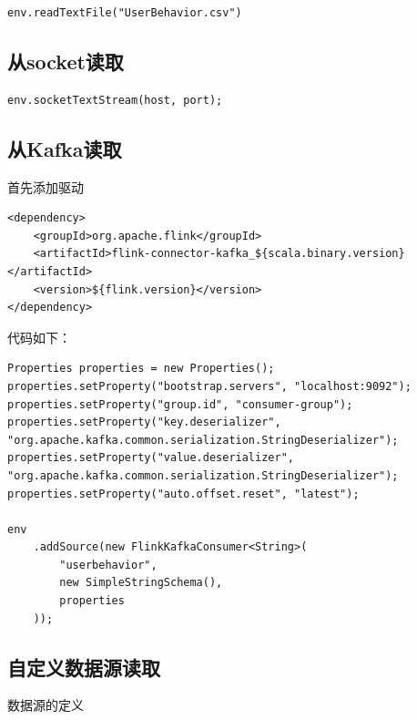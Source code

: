 \documentclass[cn,11pt,chinese]{elegantbook}
\begin{document}
\begin{verbatim}
env.readTextFile("UserBehavior.csv")
\end{verbatim}

\subsection{从socket读取}

\begin{verbatim}
env.socketTextStream(host, port);
\end{verbatim}

\subsection{从Kafka读取}

首先添加驱动

\begin{verbatim}
<dependency>
    <groupId>org.apache.flink</groupId>
    <artifactId>flink-connector-kafka_${scala.binary.version}</artifactId>
    <version>${flink.version}</version>
</dependency>
\end{verbatim}

代码如下：

\begin{verbatim}
Properties properties = new Properties();
properties.setProperty("bootstrap.servers", "localhost:9092");
properties.setProperty("group.id", "consumer-group");
properties.setProperty("key.deserializer", "org.apache.kafka.common.serialization.StringDeserializer");
properties.setProperty("value.deserializer", "org.apache.kafka.common.serialization.StringDeserializer");
properties.setProperty("auto.offset.reset", "latest");

env
    .addSource(new FlinkKafkaConsumer<String>(
        "userbehavior",
        new SimpleStringSchema(),
        properties
    ));
\end{verbatim}

\subsection{自定义数据源读取}

数据源的定义
\end{document}

